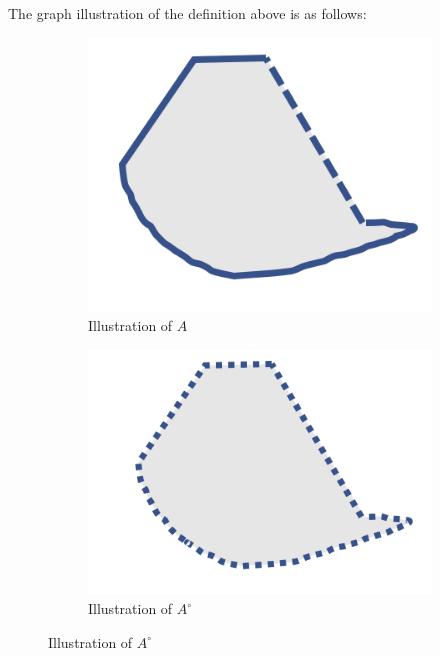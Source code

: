 \begin{definition}
The graph illustration of the definition above is as follows:
\begin{figure}[H]
        \begin{subfigure}[b]{0.3\textwidth}
                \centering
                \includegraphics[width=\textwidth]{week2/p_1}
                \caption{Illustration of $A$}
                \label{fig:gull}
        \end{subfigure}%
        \begin{subfigure}[b]{0.3\textwidth}
                \centering
                \includegraphics[width=\textwidth]{week2/p_2}
                \caption{Illustration of $A^\circ$}
                \label{fig:gull2}
        \end{subfigure}%

\end{figure}
\end{definition}
